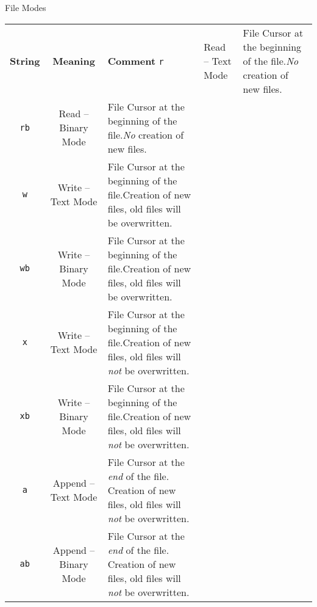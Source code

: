 \begin{frame}[fragile]{File Modes}
%
\begin{center}
\scriptsize
{}
\begin{tabular}{c|cp{.6\linewidth}}
	\toprule
	\textbf{String}	& \textbf{Meaning}         & \textbf{Comment} \tabcrlf
	\texttt{r}		& Read   -- Text Mode      & File Cursor at the beginning of the file.\newline \emph{No} creation of new files.\\
	\texttt{rb}		& Read   -- Binary Mode    & File Cursor at the beginning of the file.\newline \emph{No} creation of new files.\\
	\texttt{w}		& Write  -- Text Mode      & File Cursor at the beginning of the file.\newline Creation of new files, old files will be overwritten.\\
	\texttt{wb}		& Write  -- Binary Mode    & File Cursor at the beginning of the file.\newline Creation of new files, old files will be overwritten.\\
	\texttt{x}		& Write  -- Text Mode      & File Cursor at the beginning of the file.\newline Creation of new files, old files will \emph{not} be overwritten.\\
	\texttt{xb}		& Write  -- Binary Mode    & File Cursor at the beginning of the file.\newline Creation of new files, old files will \emph{not} be overwritten.\\
	\texttt{a}		& Append -- Text Mode      & File Cursor at the \emph{end} of the file. Creation of new files, old files will \emph{not} be overwritten.\\
	\texttt{ab}		& Append -- Binary Mode    & File Cursor at the \emph{end} of the file. Creation of new files, old files will \emph{not} be overwritten. \\
	\bottomrule
\end{tabular}
\end{center}
%
\end{frame}


